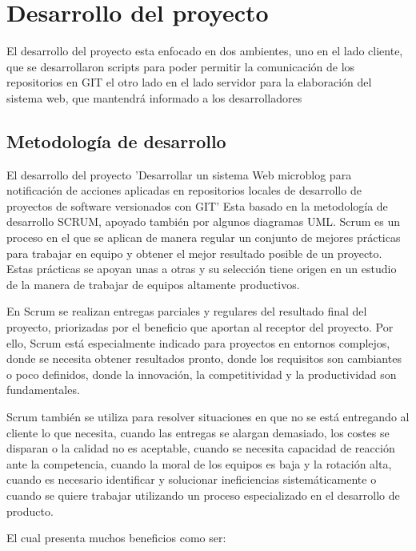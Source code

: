 



%
\chapter{Desarrollo del proyecto}
El desarrollo del proyecto esta enfocado en dos ambientes, uno en el lado cliente, que se desarrollaron scripts para poder permitir la comunicación de los repositorios en GIT
el otro lado en el lado servidor para la elaboración del sistema web, que mantendrá informado a los desarrolladores
\section{Metodología de desarrollo}
El desarrollo del proyecto 'Desarrollar un sistema Web microblog para notificación de acciones aplicadas en repositorios locales de desarrollo de proyectos de software versionados con GIT' Esta basado en la metodología de desarrollo SCRUM, apoyado también por algunos diagramas UML.
Scrum es un proceso en el que se aplican de manera regular un conjunto de mejores prácticas para trabajar en equipo y obtener el mejor resultado posible de un proyecto. Estas prácticas se apoyan unas a otras y su selección tiene origen en un estudio de la manera de trabajar de equipos altamente productivos.

En Scrum se realizan entregas parciales y regulares del resultado final del proyecto, priorizadas por el beneficio que aportan al receptor del proyecto. Por ello, Scrum está especialmente indicado para proyectos en entornos complejos, donde se necesita obtener resultados pronto, donde los requisitos son cambiantes o poco definidos, donde la innovación, la competitividad y la productividad son fundamentales.

Scrum también se utiliza para resolver situaciones en que no se está entregando al cliente lo que necesita, cuando las entregas se alargan demasiado, los costes se disparan o la calidad no es aceptable, cuando se necesita capacidad de reacción ante la competencia, cuando la moral de los equipos es baja y la rotación alta, cuando es necesario identificar y solucionar ineficiencias sistemáticamente o cuando se quiere trabajar utilizando un proceso especializado en el desarrollo de producto.

El cual presenta muchos beneficios como ser:


%
